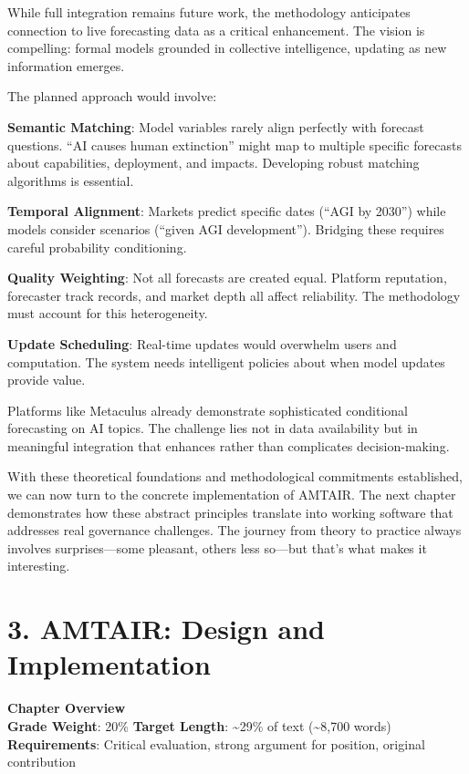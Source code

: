 \documentclass[
  11pt,
  letterpaper,
]{book}
\begin{document}
While full integration remains future work, the methodology anticipates
connection to live forecasting data as a critical enhancement. The
vision is compelling: formal models grounded in collective intelligence,
updating as new information emerges.

The planned approach would involve:

\textbf{Semantic Matching}: Model variables rarely align perfectly with
forecast questions. ``AI causes human extinction'' might map to multiple
specific forecasts about capabilities, deployment, and impacts.
Developing robust matching algorithms is essential.

\textbf{Temporal Alignment}: Markets predict specific dates (``AGI by
2030'') while models consider scenarios (``given AGI development'').
Bridging these requires careful probability conditioning.

\textbf{Quality Weighting}: Not all forecasts are created equal.
Platform reputation, forecaster track records, and market depth all
affect reliability. The methodology must account for this heterogeneity.

\textbf{Update Scheduling}: Real-time updates would overwhelm users and
computation. The system needs intelligent policies about when model
updates provide value.

Platforms like Metaculus \textcite{tetlock2022} already demonstrate
sophisticated conditional forecasting on AI topics. The challenge lies
not in data availability but in meaningful integration that enhances
rather than complicates decision-making.

With these theoretical foundations and methodological commitments
established, we can now turn to the concrete implementation of AMTAIR.
The next chapter demonstrates how these abstract principles translate
into working software that addresses real governance challenges. The
journey from theory to practice always involves surprises---some
pleasant, others less so---but that's what makes it interesting.


\chapter{3. AMTAIR: Design and Implementation}\label{sec-amtair}

\textbf{Chapter Overview}\\
\textbf{Grade Weight}: 20\% \textbar{} \textbf{Target Length}:
\textasciitilde29\% of text (\textasciitilde8,700 words)\\
\textbf{Requirements}: Critical evaluation, strong argument for
position, original contribution
\end{document}
